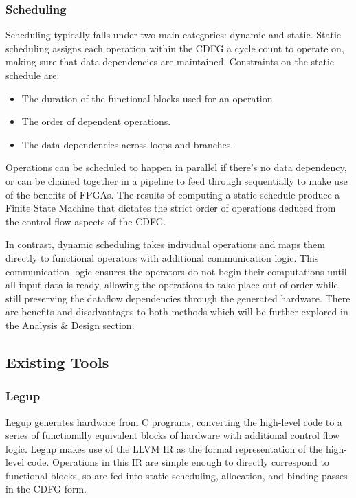 \subsubsection{Scheduling}
Scheduling typically falls under two main categories: dynamic and static. Static scheduling assigns each operation within the CDFG a cycle count to operate on, making sure that data dependencies are maintained. Constraints on the static schedule are:
\begin{itemize}
    \item The duration of the functional blocks used for an operation.
    \item The order of dependent operations.
    \item The data dependencies across loops and branches.
\end{itemize}
Operations can be scheduled to happen in parallel if there's no data dependency, or can be chained together in a pipeline to feed through sequentially to make use of the benefits of FPGAs. The results of computing a static schedule produce a Finite State Machine that dictates the strict order of operations deduced from the control flow aspects of the CDFG.


In contrast, dynamic scheduling takes individual operations and maps them directly to functional operators with additional communication logic. This communication logic ensures the operators do not begin their computations until all input data is ready, allowing the operations to take place out of order while still preserving the dataflow dependencies through the generated hardware. There are benefits and disadvantages to both methods which will be further explored in the Analysis \& Design section. %



\subsection{Existing Tools}
\subsubsection{Legup}
Legup \cite{legup_intro} generates hardware from C programs, converting the high-level code to a series of functionally equivalent blocks of hardware with additional control flow logic.
Legup makes use of the LLVM IR as the formal representation of the high-level code. Operations in this IR are simple enough to directly correspond to functional blocks, so are fed into static scheduling, allocation, and binding passes in the CDFG form. 

